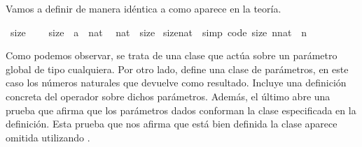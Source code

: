 \begin{isabellebody}
\begin{isamarkuptext}
  Vamos a definir  de manera idéntica a como aparece 
   en la teoría.%
\end{isamarkuptext}\isamarkuptrue%
\isamarkupfalse%
\ size{}\ {\isacharequal}\isanewline
\ \ \ size{}\ {\isacharcolon}{\isacharcolon}\ {\isachardoublequoteopen}{\isacharprime}a\ {\isasymRightarrow}\ nat{\isachardoublequoteclose}\ \isanewline
\isanewline
{}\isamarkupfalse%
\ nat\ {\isacharcolon}{\isacharcolon}\ size{}\isanewline
{}\isanewline
\isanewline
{}\isamarkupfalse%
\ size{}{\isacharunderscore}nat\ \ {\isacharbrackleft}simp{\isacharcomma}\ code{\isacharbrackright}{\isacharcolon}\ {\isachardoublequoteopen}size{}\ {\isacharparenleft}n{\isacharcolon}{\isacharcolon}nat{\isacharparenright}\ {\isacharequal}\ n{\isachardoublequoteclose}\isanewline
\isanewline
{}\isamarkupfalse%
%
\isadelimproof
\ %
\endisadelimproof
%
\isatagproof
\isacommand{{\isachardot}{\isachardot}}\isamarkupfalse%
%
\endisatagproof
{\isafoldproof}%
%
\isadelimproof
%
\endisadelimproof
\isanewline
\isanewline
{}\isamarkupfalse%
%
\begin{isamarkuptext}%
Como podemos observar, se trata de una clase que actúa sobre un 
  parámetro global de tipo  cualquiera. Por otro lado, 
   define una clase de parámetros, en este caso los 
  números naturales  que devuelve como resultado. Incluye una 
  definición concreta del operador  sobre dichos parámetros. 
  Además, el último  abre una prueba que afirma que los 
  parámetros dados conforman la clase especificada en la definición. 
  Esta prueba que nos afirma que está bien definida la clase aparece
  omitida utilizando \isa{{\isachardot}{\isachardot}} .


\end{isamarkuptext}
\end{isabellebody}
